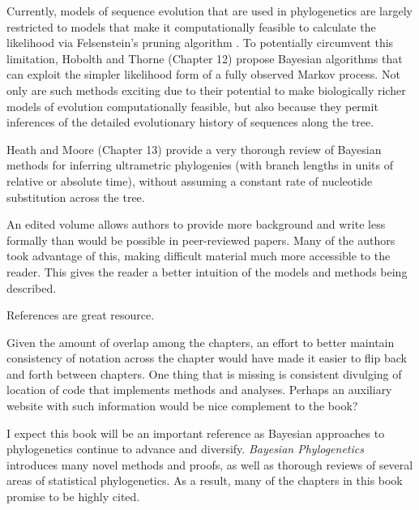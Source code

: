 \documentclass[letterpaper,12pt]{article}
\newcommand{\booktitle}{\textit{Bayesian Phylogenetics}\xspace}
\begin{document}
Currently, models of sequence evolution that are used in phylogenetics are
largely restricted to models that make it computationally feasible to calculate
the likelihood via Felsenstein's pruning algorithm \citep{Felsenstein1981}.
To potentially circumvent this limitation, Hobolth and Thorne (Chapter 12)
propose Bayesian algorithms that can exploit the simpler likelihood form
of a fully observed Markov process.
Not only are such methods exciting due to their potential to make biologically
richer models of evolution computationally feasible, 
but also because they permit inferences of the detailed evolutionary history
of sequences along the tree.

Heath and Moore (Chapter 13) provide a very thorough review of Bayesian methods
for inferring ultrametric phylogenies (with branch lengths in units  of
relative or absolute time), without assuming a constant rate of nucleotide
substitution across the tree.

An edited volume allows authors to provide more background and write less
formally than would be possible in peer-reviewed papers.
Many of the authors took advantage of this, making difficult material much more
accessible to the reader.
This gives the reader a better intuition of the models and methods
being described.

References are great resource.

Given the amount of overlap among the chapters, an effort to better maintain
consistency of notation across the chapter would have made it easier to flip
back and forth between chapters.
One thing that is missing is consistent divulging of location of code that implements methods and analyses.
Perhaps an auxiliary website with such information would be nice complement to the book?

I expect this book will be an important reference as Bayesian approaches to
phylogenetics continue to advance and diversify.
\booktitle introduces many novel methods and proofs, as well as thorough
reviews of several areas of statistical phylogenetics.
As a result, many of the chapters in this book promise to be highly cited.



\end{document}
